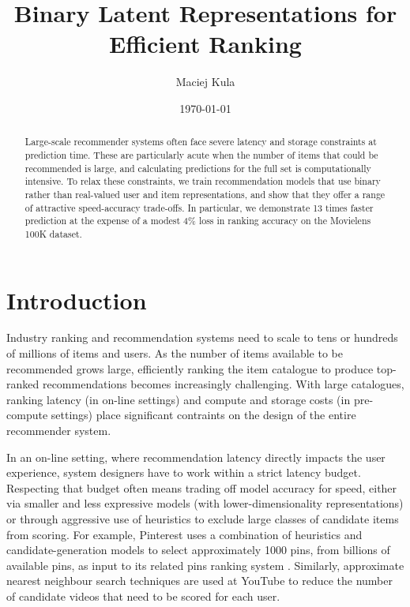 \documentclass[sigchi]{acmart}
\begin{document}
\title{Binary Latent Representations for Efficient Ranking}
\author{Maciej Kula}
\date{\today}
\acmConference[]{}{}{}


\begin{abstract}
Large-scale recommender systems often face severe latency and storage constraints at prediction time. These are particularly acute when the number of items that could be recommended is large, and calculating predictions for the full set is computationally intensive. To relax these constraints, we train recommendation models that use binary rather than real-valued user and item representations, and show that they offer a range of attractive speed-accuracy trade-offs. In particular, we demonstrate 13 times faster prediction at the expense of a modest 4\% loss in ranking accuracy on the Movielens 100K dataset.
\end{abstract}

\maketitle

\section{Introduction}
Industry ranking and recommendation systems need to scale to tens or hundreds of millions of items and users. As the number of items available to be recommended grows large, efficiently ranking the item catalogue to produce top-ranked recommendations becomes increasingly challenging. With large catalogues, ranking latency (in on-line settings) and compute and storage costs (in pre-compute settings) place significant contraints on the design of the entire recommender system.

In an on-line setting, where recommendation latency directly impacts the user experience, system designers have to work within a strict latency budget. Respecting that budget often means trading off model accuracy for speed, either via smaller and less expressive models (with lower-dimensionality representations) or through aggressive use of heuristics to exclude large classes of candidate items from scoring. For example, Pinterest uses a combination of heuristics and candidate-generation models to select approximately 1000 pins, from billions of available pins, as input to its related pins ranking system \citep{liu2017related}. Similarly, approximate nearest neighbour search techniques are used at YouTube \citep{covington2016deep} to reduce the number of candidate videos that need to be scored for each user.
\end{document}
